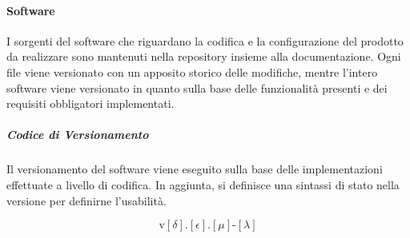 	\paragraph{Software}

	I sorgenti del software che riguardano la codifica e la configurazione del prodotto da realizzare sono mantenuti nella repository insieme alla documentazione. Ogni file viene versionato con un apposito storico delle modifiche, mentre l'intero software viene versionato in quanto  sulla base delle funzionalità presenti e dei requisiti obbligatori implementati. 


		\subparagraph{Codice di Versionamento}

		Il versionamento del software viene eseguito sulla base delle implementazioni effettuate a livello di codifica. 
		In aggiunta, si definisce una sintassi di stato nella versione per definirne l'usabilità.

		\[%
			\text{v}[\delta].[\epsilon].[\mu]\text{-}[\lambda]
		\]

